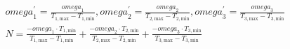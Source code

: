 \begin{align}
  & \mathit{omega}_{1}^{'} = \frac{\mathit{omega}_{1}}{T_{1 , \text{max}} - T_{1 , \text{min}}} , \mathit{omega}_{2}^{'} = \frac{\mathit{omega}_{2}}{T_{2 , \text{max}} - T_{2 , \text{min}}} , \mathit{omega}_{3}^{'} = \frac{\mathit{omega}_{3}}{T_{3 , \text{max}} - T_{3 , \text{min}}} \tag{eq\_0042\_a} \\
  & N = \frac{- \mathit{omega}_{1} \cdot T_{1 , \text{min}}}{T_{1 , \text{max}} - T_{1 , \text{min}}} + \frac{- \mathit{omega}_{2} \cdot T_{2 , \text{min}}}{T_{2 , \text{max}} - T_{2 , \text{min}}} + \frac{- \mathit{omega}_{3} \cdot T_{3 , \text{min}}}{T_{3 , \text{max}} - T_{3 , \text{min}}} \tag{eq\_0042\_b} \\
\end{align}
